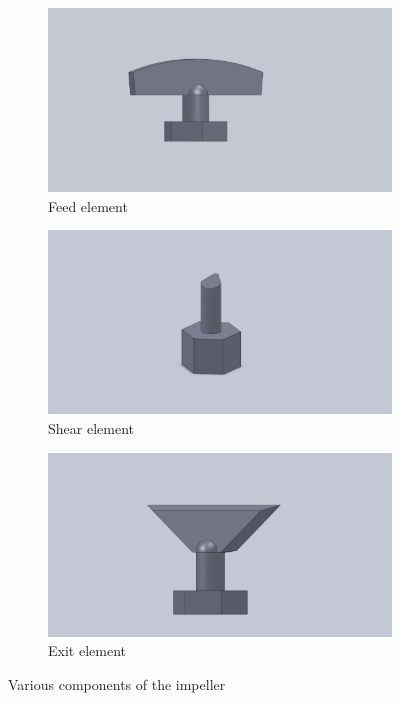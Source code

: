 \documentclass[preprint,11pt,authoryear]{elsarticle}
\begin{document}
\begin{figure}[H]

\begin{subfigure}{.3\textwidth}
	\centering
	\includegraphics[scale=0.075]{feed_element.pdf}	      
	\caption{Feed element}
	\label{fig:mthds_dem_feed_element}
\end{subfigure}%
\begin{subfigure}{.3\textwidth}
	\centering
\includegraphics[scale=0.075]{shear_element.pdf}
	\caption{Shear element}
	\label{fig:mthds_dem_shear_element}
\end{subfigure}
	\begin{subfigure}{.3\textwidth}
	\centering
\includegraphics[scale=0.075]{exit_element.pdf}
	\caption{Exit element}
	\label{fig:mthds_dem_exit_element}
\end{subfigure}



\caption{ Various components of the impeller}
\label{fig:mthds_dem_charles_fig5pt3and4_blades_n_isometric}
\end{figure}     
\end{document}
